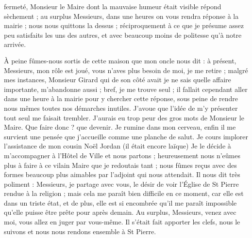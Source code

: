 \documentclass[11pt,a4paper]{report}
\begin{document}
fermeté, Monsieur le Maire dont la mauvaise humeur était visible répond sèchement ; au surplus Messieurs, dans une heures on vous rendra réponse à la mairie ; nous nous quittons la dessus ; réciproquement à ce que je présume assez peu satisfaits les uns des autres, et avec beaucoup moins de politesse qu'à notre arrivée.

À peine fûmes-nous sortis de cette maison que mon oncle nous dit : à présent, Messieurs, mon rôle est joué, vous n'aves plus besoin de moi, je me retire ; malgré mes instances, Monsieur Girard qui de son côté avait je ne sais quelle affaire importante, m'abandonne aussi ; bref, je me trouve seul ; il fallait cependant aller dans une heure à la mairie pour y chercher cette réponse, sous peine de rendre nous mêmes toutes nos démarches inutiles. J'avoue que l'idée de m'y présenter tout seul me faisait trembler. J'aurais eu trop peur des gros mots de Monsieur le Maire. Que faire donc ? que devenir. Je rumine dans mon cerveau, enfin il me survient une pensée que j'accueille comme une planche de salut. Je cours implorer l'assistance de mon cousin Noël Jordan (il était encore laïque) Je le décide à m'accompagner à l'Hôtel de Ville et nous partons ; heureusement nous n'eûmes plus à faire à ce vilain Maire que je redoutais tant ; nous fûmes reçus avec des formes beaucoup plus aimables par l'adjoint qui nous attendait. Il nous dit très poliment : Messieurs, je partage avec vous, le désir de voir l'Église de St Pierre rendue à la religion ; mais cela me paraît bien difficile en ce moment, car elle est dans un triste état, et de plus, elle est si encombrée qu'il me paraît impossible qu'elle puisse être prête pour après demain. Au surplus, Messieurs, venez avec moi, vous allez en juger par vous-même. Il s'était fait apporter les clefs, nous le suivons et nous nous rendons ensemble à St Pierre.
\end{document}
